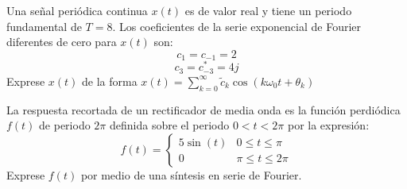 \begin{ejercicio}
    Una señal periódica continua $x(t)$ es de valor real y tiene un periodo fundamental de $T=8$. Los coeficientes de la serie exponencial de Fourier diferentes de cero para $x(t)$ son:
    $$ c_1 = c_{-1} = 2 $$
    $$ c_3 = c^*_{-3} = 4j $$
    Exprese $x(t)$ de la forma $x(t)=\sum_{k=0}^{\infty} \tilde{c}_k \cos(k\omega_0 t + \theta_k)$
\end{ejercicio}

\begin{ejercicio}
    La respuesta recortada de un rectificador de media onda es la función perdiódica $f(t)$ de periodo $2\pi$ definida sobre el periodo $0<t<2\pi$ por la expresión:
    $$
    f(t) = \left\{
        \begin{array}{ll}
            5\sin(t)   & 0 \leq t \leq \pi\\
            0          & \pi \leq t \leq 2\pi
         \end{array}
        \right.
    $$
    Exprese $f(t)$ por medio de una síntesis en serie de Fourier.
\end{ejercicio}
